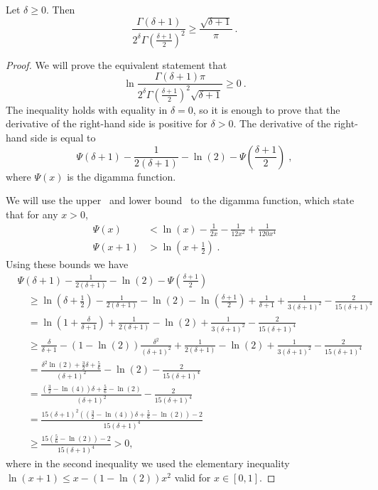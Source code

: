 \begin{lemma}
\label{lemma:ratio_gamma}
Let $\delta \geq 0$. Then
\[
\frac{\Gamma(\delta+1)}{2^\delta \Gamma(\frac{\delta+1}{2})^2}
\geq \frac{\sqrt{\delta+1}}{\pi}~.
\]
\end{lemma}
%
\begin{proof}
We will prove the equivalent statement that
\[
\ln \frac{\Gamma(\delta+1) \pi}{2^\delta \Gamma(\frac{\delta+1}{2})^2 \sqrt{\delta+1}} \geq 0~.
\]
The inequality holds with equality in $\delta=0$, so it is enough to prove that
the derivative of the right-hand side is positive for $\delta > 0$. The
derivative of the right-hand side is equal to
$$
\Psi(\delta+1) - \frac{1}{2(\delta+1)} -\ln(2) - \Psi\left(\frac{\delta+1}{2} \right) \; ,
$$
where $\Psi(x)$ is the digamma function.

We will use the upper~\citep{Chen05} and lower bound~\citep{Batir08}
to the digamma function, which state that for any $x>0$,
\begin{align*}
\Psi(x) &< \ln(x) -\frac{1}{2x} -\frac{1}{12 x^2} +\frac{1}{120 x^4} \\
\Psi(x+1) &> \ln \left(x+\frac{1}{2} \right) \; .
\end{align*}
Using these bounds we have
\begin{align*}
&\Psi(\delta+1) - \frac{1}{2(\delta+1)} - \ln(2) - \Psi \left(\frac{\delta+1}{2} \right) \\
&\quad \ge \ln \left(\delta+\frac{1}{2} \right) - \frac{1}{2(\delta+1)} -\ln(2) -\ln \left(\frac{\delta+1}{2}\right) + \frac{1}{\delta+1} +\frac{1}{3 (\delta+1)^2} -\frac{2}{15 (\delta+1)^4}\\
&\quad = \ln \left(1+\frac{\delta}{\delta+1} \right)+ \frac{1}{2(\delta+1)} -\ln(2)+\frac{1}{3 (\delta+1)^2} -\frac{2}{15 (\delta+1)^4}\\
&\quad \ge \frac{\delta}{\delta+1} - (1-\ln(2))\frac{\delta^2}{(\delta+1)^2}+ \frac{1}{2(\delta+1)} -\ln(2)+\frac{1}{3 (\delta+1)^2}-\frac{2}{15 (\delta+1)^4}\\
&\quad = \frac{\delta^2 \ln(2)+\frac{3}{2}\delta +\frac{5}{6}}{(\delta+1)^2} - \ln(2)-\frac{2}{15 (\delta+1)^4}\\
&\quad = \frac{(\frac{3}{2}-\ln(4)) \delta +\frac{5}{6}-\ln(2)}{(\delta+1)^2} -\frac{2}{15 (\delta+1)^4} \\
&\quad = \frac{15 (\delta+1)^2 \left((\frac{3}{2}-\ln(4)) \delta +\frac{5}{6}-\ln(2)\right)-2}{15(\delta+1)^4} \\
&\quad \geq \frac{15 \left(\frac{5}{6}-\ln(2)\right)-2}{15(\delta+1)^4} >0,
\end{align*}
where in the second inequality we used the elementary inequality $\ln(x+1) \leq x - (1-\ln(2))x^2$ valid for $x \in [0,1]$.
\end{proof}

